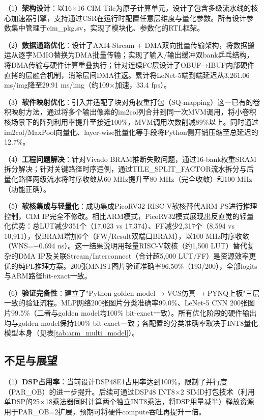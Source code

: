 \documentclass[12pt, a4paper]{article}
\begin{document}
（1）\textbf{架构设计}：以16×16 CIM Tile为原子计算单元，设计了包含多级流水线的核心加速器引擎，支持通过CSR在运行时配置任意层维度与量化参数。所有设计参数集中管理于cim\_pkg.sv，实现了模块化、参数化的RTL框架。

（2）\textbf{数据通路优化}：设计了AXI4-Stream + DMA双向批量传输架构，将数据搬运从逐字MMIO替换为DMA批量传输；实现了输入/输出缓冲双bank乒乓结构，将DMA传输与硬件计算重叠执行；针对连续FC层设计了OBUF→IBUF内部硬件直拷的层融合机制，消除层间DMA往返。累计将LeNet-5端到端延迟从3,261.06 ms/img降至29.91 ms/img（约109×加速，33.4 fps）。

（3）\textbf{软件映射优化}：引入并适配了块对角权重打包（SQ-mapping）这一已有的卷积映射方法，通过将多个输出像素的im2col列合并到同一次MVM调用，将小卷积核场景下的阵列利用率提升至接近100\%，MVM调用次数削减89\%以上。同时通过im2col/MaxPool向量化、layer-wise批量化等手段将Python侧开销压缩至总延迟的12.7\%。

（4）\textbf{工程问题解决}：针对Vivado BRAM推断失败问题，通过16-bank权重SRAM拆分解决；针对关键路径时序违例，通过TILE\_SPLIT\_FACTOR流水拆分与后量化路径两级流水将时序收敛从60 MHz提升至80 MHz（完全收敛）和100 MHz（功能正确）。

（5）\textbf{软核集成与轻量化}：成功集成PicoRV32 RISC-V软核替代ARM PS进行推理控制，CIM IP完全不修改。相比ARM模式，PicoRV32模式展现出反直觉的轻量化优势：总LUT减少351个（17,023 vs 17,374）、FF减少2,317个（8,594 vs 10,911），仅BRAM增加6个（FW/Result双端口BRAM），以100 MHz时序收敛（WNS=$-$0.694 ns）。这一结果说明用轻量RISC-V软核（约1,500 LUT）替代复杂的DMA IP及关联Stream/Interconnect（合计超5,000 LUT/FF）是资源效率更优的纯PL推理方案。200张MNIST图片验证准确率96.50\%（193/200），全部logits与ARM路径bit-exact一致。

（6）\textbf{验证完备性}：建立了"Python golden model → VCS仿真 → PYNQ上板"三层一致的验证流程。MLP网络200张图片分类准确率99.0\%、LeNet-5 CNN 200张图片99.5\%（二者与golden model均100\% bit-exact一致）。所有优化阶段的硬件输出均与golden model保持100\% bit-exact一致；各配置的分类准确率取决于INT8量化模型本身（见表\ref{tab:arm_multi_model}）。

\subsection{不足与展望}
\label{sec:future_work}

（1）\textbf{DSP占用率}：当前设计DSP48E1占用率达到100\%，限制了并行度（PAR\_OB）的进一步提升。后续可通过DSP48 INT8×2 SIMD打包技术（利用单DSP的25×18乘法器同时计算两个独立INT8乘法，将DSP用量减半）释放资源用于PAR\_OB=2扩展，预期可将硬件compute吞吐再提升一倍。
\end{document}

